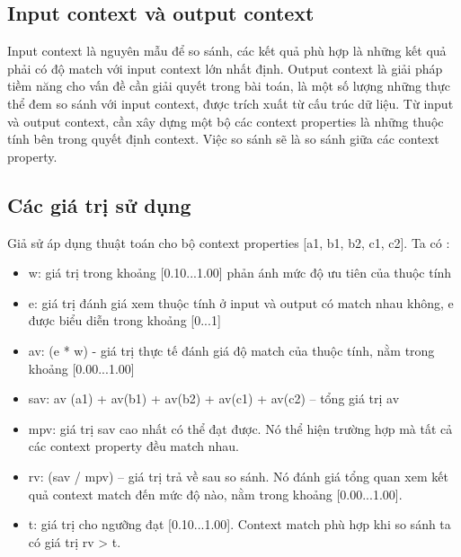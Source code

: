 \subsection{Input context và output context }	
Input context là nguyên mẫu để so sánh, các kết quả phù hợp là những kết quả phải có độ match với input context lớn nhất định. Output context là giải pháp tiềm năng cho vấn đề cần giải quyết trong bài toán, là một số lượng những thực thể đem so sánh với input context, được trích xuất từ cấu trúc dữ liệu. Từ input và output context, cần xây dựng một bộ các context properties là những thuộc tính bên trong quyết định context. Việc so sánh sẽ là so sánh giữa các context property.
\subsection{Các giá trị sử dụng}	
Giả sử áp dụng thuật toán cho bộ context properties [a1, b1, b2, c1, c2]. Ta có : 
\begin{itemize}
\item w: giá trị trong khoảng [0.10...1.00] phản ánh mức độ ưu tiên của thuộc tính 
\item e:  giá trị đánh giá xem thuộc tính ở input và output có match nhau không, e được biểu diễn trong khoảng [0...1]
\item av: (e * w) -  giá trị thực tế đánh giá độ match của thuộc tính, nằm trong khoảng  [0.00...1.00]
\item sav: av (a1) + av(b1) + av(b2) + av(c1) + av(c2) – tổng giá trị av 
\item mpv: giá trị sav cao nhất có thể đạt được. Nó thể hiện trường hợp mà tất cả các context property đều match nhau. 
\item rv: (sav / mpv) – giá trị trả về sau so sánh. Nó đánh giá tổng quan xem kết quả context match đến mức độ nào, nằm trong khoảng [0.00...1.00].  
\item t: giá trị cho ngưỡng đạt [0.10...1.00]. Context match  phù hợp khi so sánh ta có giá trị rv > t. 
 \end{itemize}
